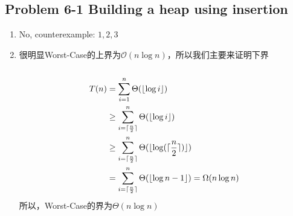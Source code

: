 \subsection*{Problem 6-1 Building a heap using insertion}
\begin{enumerate}
	\item	No, counterexample: ${1, 2, 3}$
	\item	很明显Worst-Case的上界为$\mathcal{O}(n \log n)$，所以我们主要来证明下界 \\ \\
		\begin{equation} \notag
		\begin{aligned}
		T(n) & = \sum_{i = 1}^{n} \Theta(\lfloor \log i \rfloor) \\ & \geq \sum_{i = \lceil \frac{n}{2} \rceil}^{n} \Theta(\lfloor \log i \rfloor) \\ & \geq \sum_{i = \lceil \frac{n}{2} \rceil}^{n} \Theta(\lfloor \log(\lceil \frac{n}{2} \rceil) \rfloor) \\ & = \sum_{i = \lceil \frac{n}{2} \rceil}^{n} \Theta(\lfloor \log n - 1 \rfloor) = \Omega(n \log n)
		\end{aligned}
		\end{equation}
		所以，Worst-Case的界为$\Theta(n \log n)$		
\end{enumerate}

